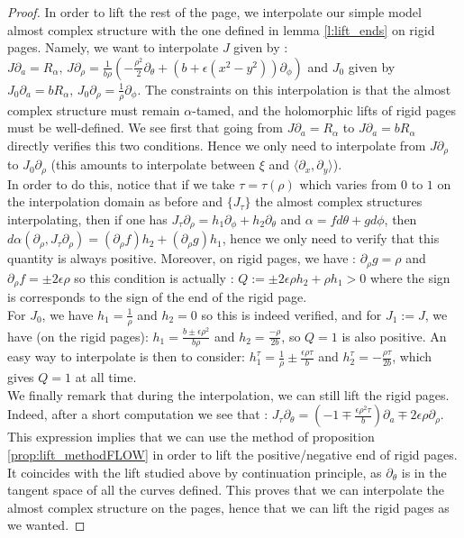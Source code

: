 \documentclass[../main.tex]{subfiles}
\begin{document}
\begin{proof}
In order to lift the rest of the page, we interpolate our simple model almost complex structure with the one defined in lemma \ref{l:lift_ends} on rigid pages. Namely, we want to interpolate $J$ given by : $J \partial_a =R_\alpha, \,J\partial_\rho = \frac{1}{b\rho}(-\frac{\rho^2}{2}\partial_\theta + (b+\epsilon(x^2-y^2))\partial_\phi)$ and $J_0$ given by $J_0\partial_a = bR_\alpha, \,J_0\partial_\rho = \frac{1}{\rho}\partial_\phi $. The constraints on this interpolation is that the almost complex structure must remain $\alpha$-tamed, and the holomorphic lifts of rigid pages must be well-defined. We see first that going from $J\partial_a = R_\alpha$ to $J\partial_a = bR_\alpha$ directly verifies this two conditions. Hence we only need to interpolate from $J\partial_\rho$ to $J_0\partial_\rho$ (this amounts to interpolate between $\xi$ and $\langle\partial_x,\partial_y\rangle$). \\
In order to do this, notice that if we take $\tau = \tau(\rho)$ which varies from $0$ to $1$ on the interpolation domain as before and $\{J_\tau\}$ the almost complex structures interpolating, then if one has $J_\tau\partial_\rho =  h_1\partial_\phi + h_2\partial_\theta $ and $\alpha = fd\theta + gd\phi$, then $d\alpha(\partial_\rho,J_\tau\partial_\rho) = (\partial_\rho f) h_2 + (\partial_\rho g) h_1$, hence we only need to verify that this quantity is always positive. Moreover, on rigid pages, we have : $\partial_\rho g = \rho$ and $\partial_\rho f = \pm 2\epsilon \rho$ so this condition is actually : $Q :=\pm 2\epsilon \rho h_2 + \rho h_1> 0$ where the sign is corresponds to the sign of the end of the rigid page.\\
For $J_0$, we have $h_1 = \frac{1}{\rho}$ and $h_2 = 0$ so this is indeed verified, and for $J_1:= J$, we have (on the rigid pages): $h_1 = \frac{b \pm\epsilon\rho^2}{b\rho}$ and $h_2 = \frac{-\rho}{2b}$, so $Q = 1$ is also positive. An easy way to interpolate is then to consider: $h_1^\tau = \frac{1}{\rho} \pm \frac{\epsilon \rho \tau}{b}$ and $h_2^\tau = -\frac{\rho \tau}{2b}$, which gives $Q= 1$ at all time. \\
                
We finally remark that during the interpolation, we can still lift the rigid pages. Indeed, after a short computation we see that : $J_\tau \partial_\theta = (-1 \mp \frac{\epsilon \rho^2\tau}{b})\partial_a \mp 2\epsilon \rho\partial_\rho$. This expression implies that we can use the method of proposition \ref{prop:lift_methodFLOW} in order to lift the positive/negative end of rigid pages. It coincides with the lift studied above by continuation principle, as $\partial_\theta$ is in the tangent space of all the curves defined. This proves that we can interpolate the almost complex structure on the pages, hence that we can lift the rigid pages as we wanted.
\end{proof}
\end{document}
